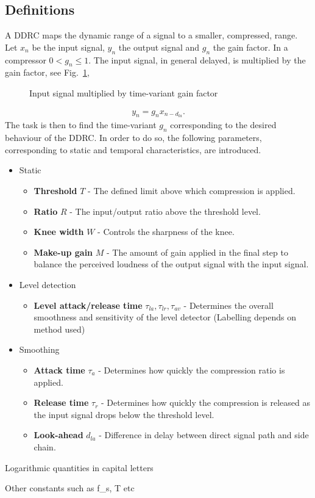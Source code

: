\documentclass[../main2.tex]{subfiles}
\providecommand{\rootdir}{..}
\begin{document}
\subsection{Definitions}\label{theory_definitions}
A DDRC maps the dynamic range of a signal to a smaller, compressed, range. Let $x_n$ be the input signal, $y_n$ the output signal and $g_n$ the gain factor. In a compressor $0<g_n\leq 1$. The input signal, in general delayed, is multiplied by the gain factor, see Fig.~\ref{fig:block_gain},
\begin{figure}
\centerline{}
\caption{Input signal multiplied by time-variant gain factor}
\label{fig:block_gain}
\end{figure}
\begin{align}
y_n = g_nx_{n-d_{la}}.
\label{eq:gainfactor}
\end{align}
The task is then to find the time-variant $g_n$ corresponding to the desired behaviour of the DDRC. In order to do so, the following parameters, corresponding to static and temporal characteristics, are introduced.
\begin{itemize}
\item{Static}
	\begin{itemize}
	\item \textbf{Threshold} $T$ - The defined limit above which compression is applied.
	\item \textbf{Ratio} $R$ - The input/output ratio above the threshold level.
	\item \textbf{Knee width}  $W$ - Controls the sharpness of the knee.
	\item \textbf{Make-up gain}  $M$ - The amount of gain applied in the final step to balance the perceived loudness of the output signal with the input signal.
\end{itemize}
\item{Level detection}
	\begin{itemize}
	\item \textbf{Level attack/release time} $\tau_{la}, \tau_{lr}, \tau_{av}$ - Determines the overall smoothness and sensitivity of the level detector (Labelling depends on method used)
	\end{itemize}
\item{Smoothing}
	\begin{itemize}
	\item \textbf{Attack time} $\tau_{a}$ - Determines how quickly the compression ratio is applied.
	\item \textbf{Release time} $\tau_{r}$ - Determines how quickly the compression is released as the input signal drops below the threshold level.
	\item \textbf{Look-ahead} $d_{la}$ - Difference in delay between direct signal path and side chain. 
	\end{itemize}
\end{itemize}

Logarithmic quantities in capital letters

Other constants such as f_s, T etc
\end{document}
